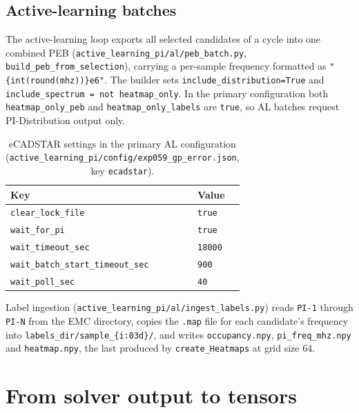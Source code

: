 \subsection{Active-learning batches}
\label{subsec:appA_al_batches}

The active-learning loop exports all selected candidates of a cycle into one combined PEB
(\texttt{active\_\allowbreak{}learning\_\allowbreak{}pi/\allowbreak{}al/\allowbreak{}peb\_\allowbreak{}batch.py}, \texttt{build\_peb\_from\_selection}), carrying a
per-sample frequency formatted as \texttt{"\{int(round(mhz))\}e6"}. The builder sets
\texttt{include\_distribution=True} and \texttt{include\_\allowbreak{}spectrum = not heatmap\_\allowbreak{}only}. In the
primary configuration both \texttt{heatmap\_only\_peb} and \texttt{heatmap\_only\_labels} are
\texttt{true}, so AL batches request PI-Distribution output only.

\begin{table}[htbp]
\centering
\caption{eCADSTAR settings in the primary AL configuration
(\texttt{active\_\allowbreak{}learning\_\allowbreak{}pi/\allowbreak{}config/\allowbreak{}exp059\_\allowbreak{}gp\_\allowbreak{}error.json}, key \texttt{ecadstar}).}
\label{tab:appA_al_ecadstar}
\begin{tabular}{p{} p{}}
\hline
Key & Value \\
\hline
\texttt{clear\_lock\_file} & \texttt{true} \\
\texttt{wait\_for\_pi} & \texttt{true} \\
\texttt{wait\_timeout\_sec} & \texttt{18000} \\
\texttt{wait\_batch\_start\_timeout\_sec} & \texttt{900} \\
\texttt{wait\_poll\_sec} & \texttt{40} \\
\hline
\end{tabular}
\end{table}

Label ingestion (\texttt{active\_\allowbreak{}learning\_\allowbreak{}pi/\allowbreak{}al/\allowbreak{}ingest\_\allowbreak{}labels.py}) reads \texttt{PI-1} through
\texttt{PI-N} from the EMC directory, copies the \texttt{.map} file for each candidate's frequency
into \texttt{labels\_dir/sample\_\{i:03d\}/}, and writes \texttt{occupancy.npy},
\texttt{pi\_freq\_mhz.npy} and \texttt{heatmap.npy}, the last produced by
\texttt{create\_Heatmaps} at grid size 64.

\section{From solver output to tensors}
\label{sec:appA_encoding}

